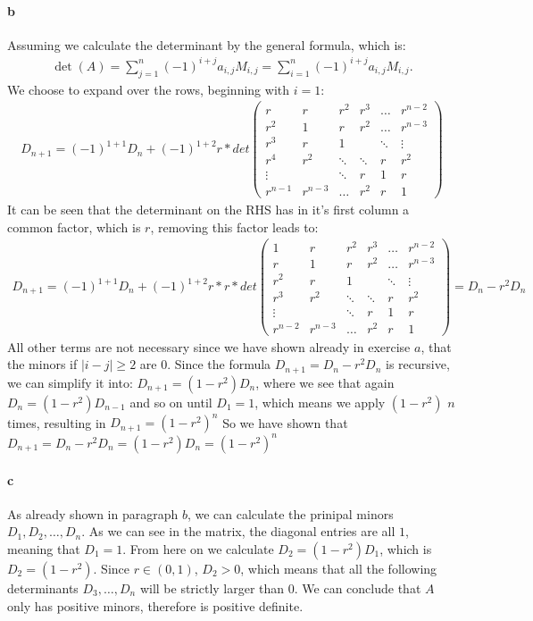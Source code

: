 \paragraph{b}
Assuming we calculate the determinant by the general formula, which is:
\begin{gather*}
\det(A) = \sum_{j=1}^n (-1)^{i+j} a_{i,j} M_{i,j} = \sum_{i=1}^n (-1)^{i+j} a_{i,j} M_{i,j}.
\end{gather*}
We choose to expand over the rows, beginning with $i = 1$:
\begin{gather*}
D_{n+1} = (-1)^{1+1} D_{n} + (-1)^{1+2} r * det \left( \begin{array}{cccccc}
r & r & r^2 & r^3 & \ldots & r^{n-2} \\
r^2 & 1 & r & r^2  & \ldots & r^{n-3} \\
r^3 & r & 1 & & \ddots & \vdots\\
r^4 & r^2 & \ddots & \ddots & r& r^2\\
\vdots &  &  \ddots & r  & 1 & r \\
r^{n-1} & r^{n-3} & \ldots & r^2 & r & 1 
\end{array} \right)
\end{gather*}
It can be seen that the determinant on the RHS has in it's first column a common factor, which is $r$, removing this factor leads to:
\begin{gather*}
D_{n+1} = (-1)^{1+1} D_{n} + (-1)^{1+2} r * r * det \left( \begin{array}{cccccc}
1 & r & r^2 & r^3 & \ldots & r^{n-2} \\
r & 1 & r & r^2  & \ldots & r^{n-3} \\
r^2 & r & 1 & & \ddots & \vdots\\
r^3 & r^2 & \ddots & \ddots & r& r^2\\
\vdots &  &  \ddots & r  & 1 & r \\
r^{n-2} & r^{n-3} & \ldots & r^2 & r & 1 
\end{array} \right) = D_n - r^2 D_n
\end{gather*}
All other terms are not necessary since we have shown already in exercise $a$, that the minors if $|i-j| \geq 2$ are 0.
Since the formula $D_{n+1} = D_n - r^2 D_n $ is recursive, we can simplify it into: $D_{n+1} = (1- r^2) D_n $, where we see that again $D_n = (1-r^2)D_{n-1} $ and so on until $D_1 = 1$, which means we apply $(1-r^2)$ $n$ times, resulting in $D_{n+1} = (1-r^2)^n$ 
So we have shown that $D_{n+1} = D_n - r^2 D_n = (1-r^2) D_n = (1-r^2)^n$

\paragraph{c}
As already shown in paragraph $b$, we can calculate the prinipal minors $D_1 , D_2 , \ldots , D_{n}$. As we can see in the matrix, the diagonal entries are all $1$, meaning that $D_1=1$. From here on we calculate $D_2 = (1-r^2) D_1$, which is $D_2 = (1-r^2)$. Since $r \in (0,1)$, $D_2 > 0$, which means that all the following determinants $D_3, \ldots , D_n$ will be strictly larger than 0. We can conclude that $A$ only has positive minors, therefore is positive definite.
